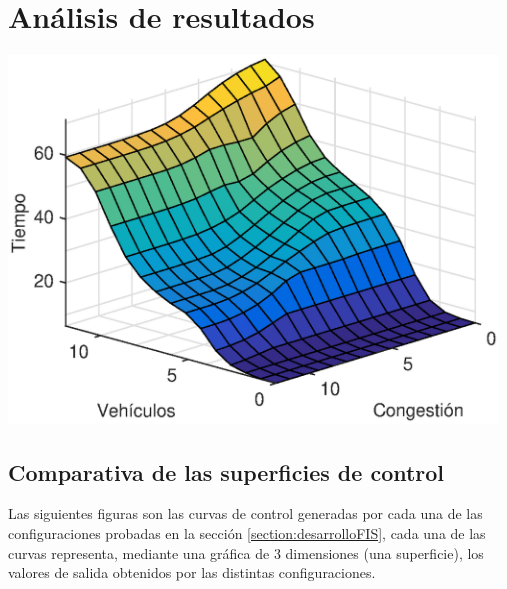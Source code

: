 \chapter{Análisis de resultados}

\begin{center}
	\includegraphics[width=13cm]{Surfaces/surface_d.eps}
	\label{fig:surfaceControl}
\end{center}

\section{Comparativa de las superficies de control}
Las siguientes figuras son las curvas de control generadas por cada una de las configuraciones probadas en la sección \ref{section:desarrolloFIS}, cada una de las curvas representa, mediante una gráfica de 3 dimensiones (una superficie), los valores de salida obtenidos por las distintas configuraciones.

